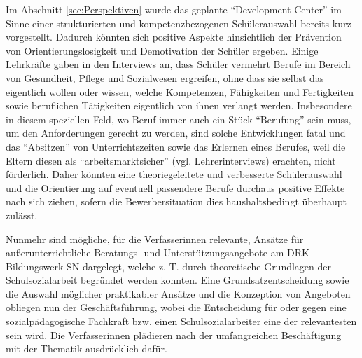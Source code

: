 Im Abschnitt \ref{sec:Perspektiven} wurde das geplante "`Development-Center"' im Sinne einer strukturierten und kompetenzbezogenen Schülerauswahl bereits kurz vorgestellt. Dadurch könnten sich positive Aspekte hinsichtlich der Prävention von Orientierungslosigkeit und Demotivation der Schüler ergeben. Einige Lehrkräfte gaben in den Interviews an, dass Schüler vermehrt Berufe im Bereich von Gesundheit, Pflege und Sozialwesen ergreifen, ohne dass sie selbst das eigentlich wollen oder wissen, welche Kompetenzen, Fähigkeiten und Fertigkeiten sowie beruflichen Tätigkeiten eigentlich von ihnen verlangt werden. Insbesondere in diesem speziellen Feld, wo Beruf immer auch ein Stück "`Berufung"' sein muss, um den Anforderungen gerecht zu werden, sind solche Entwicklungen fatal und das "`Absitzen"' von Unterrichtszeiten sowie das Erlernen eines Berufes, weil die Eltern diesen als "`arbeitsmarktsicher"' (vgl. Lehrerinterviews) erachten, nicht förderlich. Daher könnten eine theoriegeleitete  und verbesserte Schülerauswahl und die Orientierung auf eventuell passendere Berufe durchaus positive Effekte nach sich ziehen, sofern die Bewerbersituation dies haushaltsbedingt überhaupt zulässt. 

Nunmehr sind mögliche, für die Verfasserinnen relevante, Ansätze für außerunterrichtliche Beratungs- und Unterstützungsangebote am DRK Bildungswerk SN dargelegt, welche z. T. durch theoretische Grundlagen der Schulsozialarbeit begründet werden konnten. Eine Grundsatzentscheidung sowie die Auswahl möglicher praktikabler Ansätze und die Konzeption von Angeboten obliegen nun der Geschäftsführung, wobei die Entscheidung für oder gegen eine sozialpädagogische Fachkraft bzw. einen Schulsozialarbeiter eine der relevantesten sein wird. Die Verfasserinnen plädieren nach der umfangreichen Beschäftigung mit der Thematik ausdrücklich dafür. 

